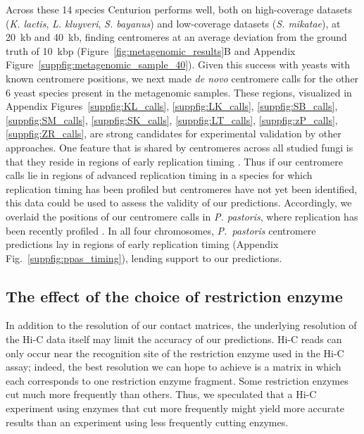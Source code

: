 Across these 14 species Centurion performs well, both on high-coverage
datasets (\textit{K. lactis}, \textit{L. kluyveri}, \textit{S. bayanus}) and
low-coverage datasets (\textit{S. mikatae}), at 20~kb and 40~kb, finding
centromeres at an average deviation from the ground truth of 10~kbp
(Figure~\ref{fig:metagenomic_results}B and Appendix
Figure~\ref{suppfig:metagenomic_sample_40}).
Given this success with yeasts with
known centromere positions, we next made \textit{de novo} centromere calls for the
other 6 yeast species present in the metagenomic samples. These regions,
visualized in Appendix Figures~\ref{suppfig:KL_calls}, \ref{suppfig:LK_calls},
\ref{suppfig:SB_calls}, \ref{suppfig:SM_calls}, \ref{suppfig:SK_calls},
\ref{suppfig:LT_calls}, \ref{suppfig:zP_calls}, \ref{suppfig:ZR_calls}, are strong candidates for
experimental validation by other approaches. One feature that is shared by
centromeres across all studied fungi is that they reside in regions of early
replication timing \citep{koren:epigenetically, pohl:functional}. Thus if our
centromere calls lie in regions of advanced replication timing in a species
for which replication timing has been profiled but centromeres have not
yet been identified, this data could be used to assess the validity of
our predictions. Accordingly, we
overlaid the positions of our centromere calls in \textit{P. pastoris}, where
replication has been recently profiled \citep{liachko:gc-rich}. In all four
chromosomes, \textit{P.\ pastoris} centromere predictions lay in regions of
early replication timing (Appendix Fig.~\ref{suppfig:ppas_timing}),
lending support to our predictions.

\subsection{The effect of the choice of restriction enzyme}

In addition to the resolution of our contact matrices, the underlying
resolution of the Hi-C data itself may limit the accuracy of our predictions.
Hi-C reads can only occur near the recognition site of the restriction enzyme
used in the Hi-C assay; indeed, the best resolution we can hope to achieve is
a matrix in which each corresponds to one restriction enzyme fragment. Some
restriction enzymes cut much more frequently than others. Thus, we speculated
that a Hi-C experiment using enzymes that cut more frequently might yield more
accurate results than an experiment using less frequently cutting enzymes.

